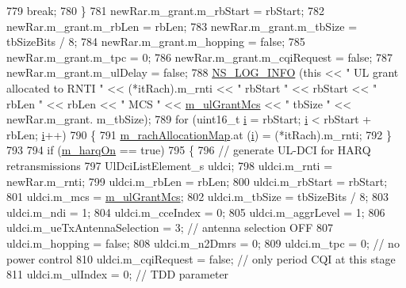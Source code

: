 \begin{DoxyCode}
779           \textcolor{keywordflow}{break};
780         \}
781       newRar.m\_grant.m\_rbStart = rbStart;
782       newRar.m\_grant.m\_rbLen = rbLen;
783       newRar.m\_grant.m\_tbSize = tbSizeBits / 8;
784       newRar.m\_grant.m\_hopping = \textcolor{keyword}{false};
785       newRar.m\_grant.m\_tpc = 0;
786       newRar.m\_grant.m\_cqiRequest = \textcolor{keyword}{false};
787       newRar.m\_grant.m\_ulDelay = \textcolor{keyword}{false};
788       \hyperlink{group__logging_gafbd73ee2cf9f26b319f49086d8e860fb}{NS\_LOG\_INFO} (\textcolor{keyword}{this} << \textcolor{stringliteral}{" UL grant allocated to RNTI "} << (*itRach).m\_rnti << \textcolor{stringliteral}{" rbStart "} << 
      rbStart << \textcolor{stringliteral}{" rbLen "} << rbLen << \textcolor{stringliteral}{" MCS "} << \hyperlink{classns3_1_1PssFfMacScheduler_a535c4d18454b96af02427b81a3b20930}{m\_ulGrantMcs} << \textcolor{stringliteral}{" tbSize "} << newRar.m\_grant.
      m\_tbSize);
789       \textcolor{keywordflow}{for} (uint16\_t \hyperlink{bernuolliDistribution_8m_a6f6ccfcf58b31cb6412107d9d5281426}{i} = rbStart; \hyperlink{bernuolliDistribution_8m_a6f6ccfcf58b31cb6412107d9d5281426}{i} < rbStart + rbLen; \hyperlink{bernuolliDistribution_8m_a6f6ccfcf58b31cb6412107d9d5281426}{i}++)
790         \{
791           \hyperlink{classns3_1_1PssFfMacScheduler_af093989004d46e1bf45ba2bdb1dfa03e}{m\_rachAllocationMap}.at (\hyperlink{bernuolliDistribution_8m_a6f6ccfcf58b31cb6412107d9d5281426}{i}) = (*itRach).m\_rnti;
792         \}
793 
794       \textcolor{keywordflow}{if} (\hyperlink{classns3_1_1PssFfMacScheduler_a7163e6149892abe4c17ce95be6bf1953}{m\_harqOn} == \textcolor{keyword}{true})
795         \{
796           \textcolor{comment}{// generate UL-DCI for HARQ retransmissions}
797           UlDciListElement\_s uldci;
798           uldci.m\_rnti = newRar.m\_rnti;
799           uldci.m\_rbLen = rbLen;
800           uldci.m\_rbStart = rbStart;
801           uldci.m\_mcs = \hyperlink{classns3_1_1PssFfMacScheduler_a535c4d18454b96af02427b81a3b20930}{m\_ulGrantMcs};
802           uldci.m\_tbSize = tbSizeBits / 8;
803           uldci.m\_ndi = 1;
804           uldci.m\_cceIndex = 0;
805           uldci.m\_aggrLevel = 1;
806           uldci.m\_ueTxAntennaSelection = 3; \textcolor{comment}{// antenna selection OFF}
807           uldci.m\_hopping = \textcolor{keyword}{false};
808           uldci.m\_n2Dmrs = 0;
809           uldci.m\_tpc = 0; \textcolor{comment}{// no power control}
810           uldci.m\_cqiRequest = \textcolor{keyword}{false}; \textcolor{comment}{// only period CQI at this stage}
811           uldci.m\_ulIndex = 0; \textcolor{comment}{// TDD parameter}

\end{DoxyCode}
